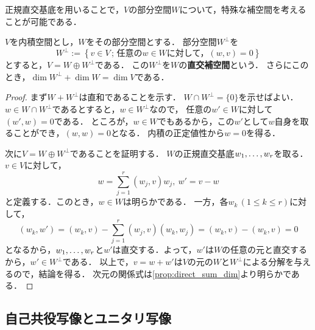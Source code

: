 正規直交基底を用いることで，$V$の部分空間$W$について，特殊な補空間を考えることが可能である．
\begin{prop}
$V$を内積空間とし，$W$をその部分空間とする．
部分空間$W^\perp$を
\[
  W^\perp := \left\{ v \in V \,;\, \mbox{任意の$w \in W$に対して，$(w,v) = 0$} \right\}
\]
とすると，$V = W \oplus W^\perp$である．
この$W^\perp$を$W$の\textbf{直交補空間}という．
さらにこのとき，$\dim W^\perp + \dim W = \dim V$である．
\end{prop}
\begin{proof}
まず$W + W^\perp$は直和であることを示す．
$W \cap W^\perp = \{0\}$を示せばよい．
$w \in W \cap W^\perp$であるとすると，$w \in W^\perp$なので，
任意の$w' \in W$に対して$(w',w)=0$である．
ところが，$w \in W$でもあるから，この$w'$として$w$自身を取ることができ，$(w,w)=0$となる．
内積の正定値性から$w = 0$を得る．

次に$V = W \oplus W^\perp$であることを証明する．
$W$の正規直交基底$w_{1},\dots,w_{r}$を取る．
$v \in V$に対して，
\[
  w = \sum_{j=1}^r (w_j,v)w_j,\ w'=v-w
\]
と定義する．このとき，$w \in W$は明らかである．
一方，各$w_k\,(1 \le k \le r)$に対して，
\[
  (w_k,w') = (w_k,v)-\sum_{j=1}^r (w_j,v)(w_k,w_j) = (w_k,v) - (w_k,v) = 0
\]
となるから，$w_{1},\dots,w_{r}$と$w'$は直交する．よって，$w'$は$W$の任意の元と直交するから，$w' \in W^\perp$である．
以上で，$v = w + w'$は$V$の元の$W$と$W^\perp$による分解を与えるので，結論を得る．
次元の関係式は\cref{prop:direct_sum_dim}より明らかである．
\end{proof}
\subsection{自己共役写像とユニタリ写像}

